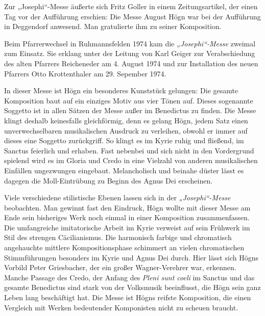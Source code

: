 Zur „Josephi“-Messe äußerte sich Fritz Goller in einem Zeitungsartikel,
der einen Tag vor der Aufführung erschien: \zitat{}Die
Messe  August Högn war bei der Aufführung in Deggendorf
anwesend. Man gratulierte ihm zu seiner Komposition.

Beim Pfarrerwechsel in Ruhmannsfelden 1974 kam die
\textit{„Josephi“-Messe} zweimal zum Einsatz. Sie erklang unter der
Leitung von Karl Geiger zur Verabschiedung des alten Pfarrers
Reicheneder am 4. August 1974 und zur Installation des neuen Pfarrers
Otto Krottenthaler am 29. Sepember 1974.

In dieser Messe ist Högn ein besonderes Kunststück gelungen: Die
gesamte Komposition baut auf ein einziges Motiv aus vier Tönen auf.
Dieses sogenannte Soggetto ist in allen Sätzen der Messe außer im
Benedictus zu finden. Die Messe klingt deshalb keinesfalls
gleichförmig, denn es gelang Högn, jedem Satz einen unverwechselbaren
musikalischen Ausdruck zu verleihen, obwohl er immer auf dieses eine
Soggetto zurückgriff. So klingt es im Kyrie ruhig und fließend, im
Sanctus feierlich und erhaben. Fast nebenbei und sich nicht in den
Vordergrund spielend wird es im Gloria und Credo in eine Vielzahl von
anderen musikalischen Einfällen ungezwungen eingebaut. Melancholisch
und beinahe düster lässt es dagegen die Moll-Eintrübung zu Beginn des
Agnus Dei erscheinen.

Viele verschiedene stilistische Ebenen lassen sich in der
\textit{„Josephi“-Messe} beobachten. Man gewinnt fast den Eindruck,
Högn wollte mit dieser Messe am Ende sein bisheriges Werk noch einmal
in einer Komposition zusammenfassen. Die umfangreiche imitatorische
Arbeit im Kyrie verweist auf sein Frühwerk im Stil des strengen
Cäcilianismus. Die harmonisch farbige und chromatisch angehauchte
mittlere Kompositionsphase schimmert an vielen chromatischen
Stimmführungen besonders im Kyrie und Agnus Dei durch. Hier lässt sich
Högns Vorbild Peter Griesbacher, der ein großer Wagner-Verehrer war,
erkennen. Manche Passage des Credo, der Anfang des \textit{Pleni sunt
coeli} im Sanctus und das gesamte Benedictus sind stark von der
Volksmusik beeinflusst, die Högn sein ganz Leben lang beschäftigt
hat. Die Messe ist Högns reifste Komposition, die einen Vergleich mit
Werken bedeutender Komponisten nicht zu scheuen braucht.

